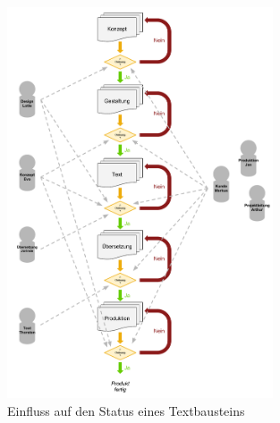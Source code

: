 \begin{figure}[htb]
\begin{center}
\includegraphics[width=0.70\textwidth]{media/WorkflowmitFeedback.pdf}
\end{center}
\caption{Einfluss auf den Status eines Textbausteins}
\label{chart:workflowmitfeedback}
\end{figure}

